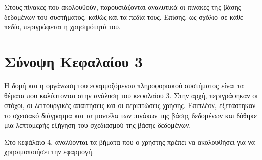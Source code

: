 Στους πίνακες που ακολουθούν, παρουσιάζονται αναλυτικά οι πίνακες της βάσης δεδομένων του συστήματος, καθώς και τα πεδία τους. Επίσης, ως σχόλιο σε κάθε πεδίο, περιγράφεται η χρησιμότητά του.

\FloatBarrier

\FloatBarrier

\section{Σύνοψη Κεφαλαίου 3}
Η δομή και η οργάνωση του εφαρμοζόμενου πληροφοριακού συστήματος είναι τα θέματα που καλύπτονται στην ανάλυση του κεφαλαίου 3. Στην αρχή, περιγράφηκαν οι στόχοι, οι λειτουργικές απαιτήσεις και οι περιπτώσεις χρήσης. Επιπλέον, εξετάστηκαν το σχεσιακό διάγραμμα και τα μοντέλα των πινάκων της βάσης δεδομένων και δόθηκε μια λεπτομερής εξήγηση του σχεδιασμού της βάσης δεδομένων.

Στο κεφάλαιο 4, αναλύονται τα βήματα που ο χρήστης πρέπει να ακολουθήσει για να χρησιμοποιήσει την εφαρμογή.
